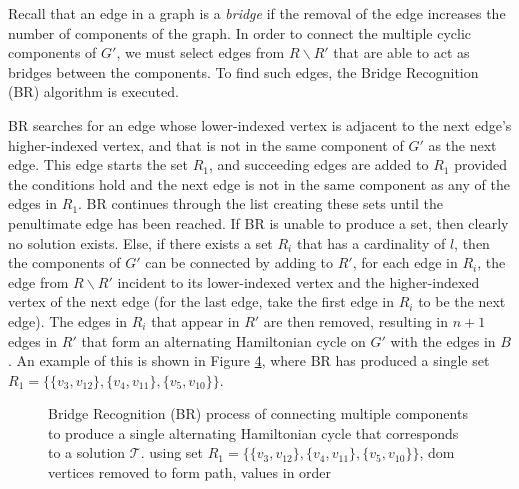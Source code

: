 \documentclass{elsarticle}
\begin{document}
Recall that an edge in a graph is a \emph{bridge} if the removal of the edge increases the number of components of the graph. In order to connect the multiple cyclic components of $G'$, we must select edges from $R \backslash R'$ that are able to act as bridges between the components. To find such edges, the Bridge Recognition (BR) algorithm is executed.

BR searches for an edge whose lower-indexed vertex is adjacent to the next edge's higher-indexed vertex, and that is not in the same component of $G'$ as the next edge. This edge starts the set $R_1$, and succeeding edges are added to $R_1$ provided the conditions hold and the next edge is not in the same component as any of the edges in $R_1$. BR continues through the list creating these sets until the penultimate edge has been reached. If BR is unable to produce a set, then clearly no solution exists. Else, if there exists a set $R_i$ that has a cardinality of $l$, then the components of $G'$ can be connected by adding to $R'$, for each edge in $R_i$, the edge from $R \backslash R'$ incident to its lower-indexed vertex and the higher-indexed vertex of the next edge (for the last edge, take the first edge in $R_i$ to be the next edge). The edges in $R_i$ that appear in $R'$ are then removed, resulting in $n+1$ edges in $R'$ that form an alternating Hamiltonian cycle on $G'$ with the edges in $B$. An example of this is shown in Figure \ref{fig:br}, where BR has produced a single set $R_1 = \{\{v_3, v_{12}\},\{v_4, v_{11}\}, \{v_5, v_{10}\}\}$.

\begin{figure}[H]	
	\centering
	\begin{subfigure}[h]{0.23\textwidth}
		
		\label{fig:mpsconnect}
	\end{subfigure} \hspace{5mm} %
	\begin{subfigure}[h]{0.23\textwidth}
		
		\label{fig:mpscycle}
	\end{subfigure} \hspace{5mm}
	\begin{subfigure}[h]{0.23\textwidth}
		
		\label{fig:mpspath}
	\end{subfigure}
	\caption{Bridge Recognition (BR) process of connecting multiple components to produce a single alternating Hamiltonian cycle that corresponds to a solution $\mathcal{T}$. \alert{using set $R_1 = \{\{v_3, v_{12}\}, \{v_4, v_{11}\}, \{v_5, v_{10}\}\}$, dom vertices removed to form path, values in order}}
	\label{fig:br}
\end{figure}
\end{document}

